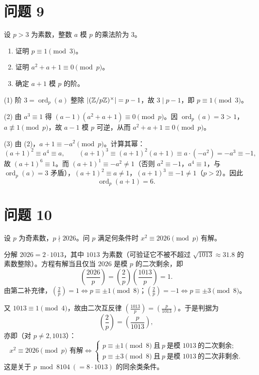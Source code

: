 \documentclass{article}
\newcommand{\leg}[2]{\left(\frac{#1}{#2}\right)}
\newcommand{\ord}{\operatorname{ord}}
\begin{document}
\section{问题 9}

设 $p>3$ 为素数，整数 $a$ 模 $p$ 的乘法阶为 $3$。

\begin{enumerate}[(1)]
  \item 证明 $p\equiv 1\pmod 3$。
  \item 证明 $a^2+a+1\equiv 0\pmod p$。
  \item 确定 $a+1$ 模 $p$ 的阶。
\end{enumerate}

\begin{solution}
  (1) 阶 $3=\ord_p(a)$ 整除 $\left| (\mathbb{Z}/p\mathbb{Z})^\times \right|=p-1$，故 $3\mid p-1$，即 $p\equiv 1\pmod 3$。

  (2) 由 $a^3\equiv 1$ 得 $(a-1)(a^2+a+1)\equiv 0\pmod p$。因 $\ord_p(a)=3>1$，$a\not\equiv1\pmod p$，故 $a-1$ 模 $p$ 可逆，从而 $a^2+a+1\equiv 0\pmod p$。

  (3) 由 (2)，$a+1\equiv -a^2\pmod p$。计算其幂：
  \[
    (a+1)^2\equiv a^4\equiv a,\qquad
    (a+1)^3\equiv (a+1)^2(a+1)\equiv a\cdot(-a^2)=-a^3\equiv -1,
  \]
  故 $(a+1)^6\equiv 1$。而 $(a+1)^1\equiv -a^2\ne 1$（否则 $a^2\equiv -1$，$a^4\equiv1$，与 $\ord_p(a)=3$ 矛盾），$(a+1)^2\equiv a\ne1$，$(a+1)^3\equiv-1\ne1$（$p>2$）。因此
  \[
    \boxed{\ \ord_p(a+1)=6.\ }
  \]
\end{solution}

\section{问题 10}

设 $p$ 为奇素数，$p\nmid 2026$。问 $p$ 满足何条件时 $x^2\equiv 2026\pmod p$ 有解。

\begin{solution}
  分解 $2026=2\cdot 1013$，其中 $1013$ 为素数（可验证它不被不超过 $\sqrt{1013}\approx31.8$ 的素数整除）。方程有解当且仅当 $2026$ 是模 $p$ 的二次剩余，即
  \[
    \leg{2026}{p}=\leg{2}{p}\leg{1013}{p}=1 .
  \]
  由第二补充律，$\leg2p=1\iff p\equiv\pm1\pmod 8$；$\leg2p=-1\iff p\equiv\pm3\pmod8$。

  又 $1013\equiv 1\pmod 4$，故由二次互反律 $\leg{1013}{p}=\leg{p}{1013}$。于是判据为
  \[
    \boxed{\ \leg2p=\leg{p}{1013},\ }
  \]
  亦即（对 $p\ne 2,1013$）：
  \[
    x^2\equiv2026\pmod p\text{ 有解}\iff
    \begin{cases}
      p\equiv\pm1\pmod8\ \text{且}\ p\ \text{是模 }1013\ \text{的二次剩余};\\[2pt]
      p\equiv\pm3\pmod8\ \text{且}\ p\ \text{是模 }1013\ \text{的二次非剩余}.
    \end{cases}
  \]
  这是关于 $p\bmod 8104\ (=8\cdot1013)$ 的同余类条件。
\end{solution}
\end{document}
